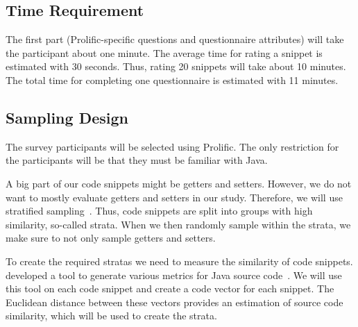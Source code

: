 \documentclass[%
class=scrreprt,
chapterprefix=false,%
open=right,%
twoside=false,%
paper=a4,%
logofile={Logo\_zentral\_farbig\_EN.png},%
thesistype=masterproposal,%
UKenglish,%
]{se2thesis}
\begin{document}

\subsection{Time Requirement}
The first part (Prolific-specific questions and questionnaire attributes) will take the participant about one minute. The average time for rating a snippet is estimated with 30 seconds. Thus, rating 20 snippets will take about 10 minutes. The total time for completing one questionnaire is estimated with 11 minutes.

\subsection{Sampling Design}
The survey participants will be selected using Prolific. The only restriction for the participants will be that they must be familiar with Java.

A big part of our code snippets might be getters and setters. However, we do not want to mostly evaluate getters and setters in our study. Therefore, we will use stratified sampling~\cite{thompson2012sampling}. Thus, code snippets are split into groups with high similarity, so-called strata. When we then randomly sample within the strata, we make sure to not only sample getters and setters.

To create the required stratas we need to measure the similarity of code snippets. \citeauthor{scalabrino2016improving} developed a tool to generate various metrics for Java source code~\cite{scalabrino2016improving}. We will use this tool on each code snippet and create a code vector for each snippet. The Euclidean distance between these vectors provides an estimation of source code similarity, which will be used to create the strata.
\end{document}
